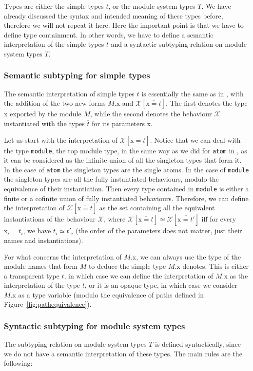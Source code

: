 \documentclass[a4paper,10pt]{article}
\newcommand{\tx}{\textrm{x}}
\newcommand{\BX}{\ensuremath{\mathcal{X}}}
\begin{document}
Types are either the simple types $t$, or the module system types $T$. We have already discussed the syntax and intended meaning of these types before, therefore we will not repeat it here. Here the important point is that we have to define type containment. In other words, we have to define a semantic interpretation of the simple types $t$ and a syntactic subtyping relation on module system types $T$. 

\subsubsection{Semantic subtyping for simple types}
The semantic interpretation of simple types $t$ is essentially the same as in \cite{CDV24,CD25}, with the addition of the two new forms $M.\tx$ and $\BX[\overline{\tx=t}]$. The first denotes the type $\tx$ exported by the module $M$, while the second denotes the behaviour $\BX$ instantiated with the types $\overline{t}$ for its parameters $\overline{\tx}$.

Let us start with the interpretation of $\BX[\overline{\tx=t}]$. Notice that we can deal with the type \texttt{module}, the top module type, in the same way as we did for \texttt{atom} in \cite{CD25}, as it can be considered as the infinite union of all the singleton types that form it. In the case of \texttt{atom} the singleton types are the single atoms. In the case of \texttt{module} the singleton types are all the fully instantiated behaviours, modulo the equivalence of their instantiation. Then every type contained in \texttt{module} is either a finite or a cofinite union of fully instantiated behaviours.
Therefore, we can define the interpretation of $\BX[\overline{\tx=t}]$ as the set containing all the equivalent instantiations of the behaviour $\BX$, where $\BX[\overline{\tx=t}]\simeq\BX[\overline{\tx=t'}]$ iff for every $\tx_i=t_i$, we have $t_i\simeq t'_i$ (the order of the parameters does not matter, just their names and instantiations).

For what concerns the interpretation of $M.\tx$, we can always use the type of the module names that form $M$ to deduce the simple type $M.\tx$ denotes. This is either a transparent type $t$, in which case we can define the interpretation of $M.\tx$ as the interpretation of the type $t$, or it is an opaque type, in which case we consider $M.\tx$ as a type variable (modulo the equivalence of paths defined in Figure~\ref{fig:pathequivalence}).


\subsubsection{Syntactic subtyping for module system types}
The subtyping relation on module system types $T$ is defined syntactically, since we do not have a semantic interpretation of these types. The main rules are the following:
\end{document}
